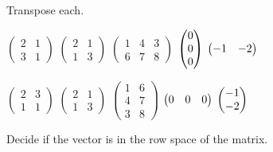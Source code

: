 \begin{exercises}
  \item 
    Transpose each.
    \begin{exparts*}
      \partsitem \( \begin{pmatrix}
                 2  &1  \\
                 3  &1
               \end{pmatrix}  \)
      \partsitem \( \begin{pmatrix}
                 2  &1  \\
                 1  &3
               \end{pmatrix}  \)
      \partsitem \( \begin{pmatrix}
                 1  &4  &3 \\
                 6  &7  &8
               \end{pmatrix}  \)
      \partsitem \( \begin{pmatrix} 0 \\ 0 \\ 0 \end{pmatrix} \)
      \partsitem \( \begin{pmatrix} -1 &-2 \end{pmatrix} \)
    \end{exparts*}
    \begin{answer}  
      \begin{exparts*}
        \partsitem \( \begin{pmatrix}
                   2  &3  \\
                   1  &1
                 \end{pmatrix}  \)
        \partsitem \( \begin{pmatrix}
                   2  &1  \\
                   1  &3
                 \end{pmatrix}  \)
        \partsitem \( \begin{pmatrix}
                   1  &6  \\
                   4  &7  \\
                   3  &8
                 \end{pmatrix}  \)
        \partsitem \( \begin{pmatrix} 0 &0 &0 \end{pmatrix} \)
        \partsitem \( \begin{pmatrix} -1 \\ -2 \end{pmatrix} \)
      \end{exparts*}  
    \end{answer}
  \recommended \item 
    Decide if the vector is in the row space of the matrix.
\end{exercises}
